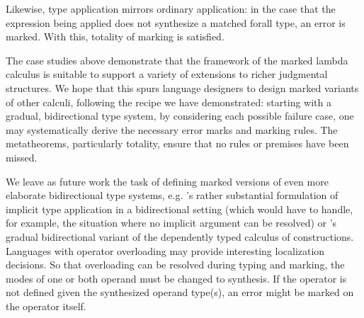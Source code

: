 Likewise, type application mirrors ordinary application: in the case that the expression being applied does not synthesize a matched forall type, an error is marked. With this, totality of marking is satisfied.
%
\begin{mathpar}

\end{mathpar}

The case studies above demonstrate that the framework of the marked lambda calculus is suitable to support a variety of extensions to richer judgmental structures.
We hope that this spurs language designers to design marked variants of other calculi, following the
recipe we have demonstrated: starting with a gradual, bidirectional type system, by considering each
possible failure case, one may systematically derive the necessary error marks and marking rules.
The metatheorems, particularly totality, ensure that no rules or premises have been missed.

We leave as future work the task of defining marked versions of even more elaborate bidirectional
type systems, e.g. \citet{dunfield2013complete}'s rather substantial formulation of implicit type
application in a bidirectional setting (which would have to handle, for example, the situation where
no implicit argument can be resolved) or \citet{DBLP:phd/hal/LennonBertrand22}'s gradual bidirectional
variant of the dependently typed calculus of constructions. Languages with operator overloading may
provide interesting localization decisions. So that overloading can be resolved during typing and
marking, the modes of one or both operand must be changed to synthesis. If the operator is not
defined given the synthesized operand type(s), an error might be marked on the operator itself.
